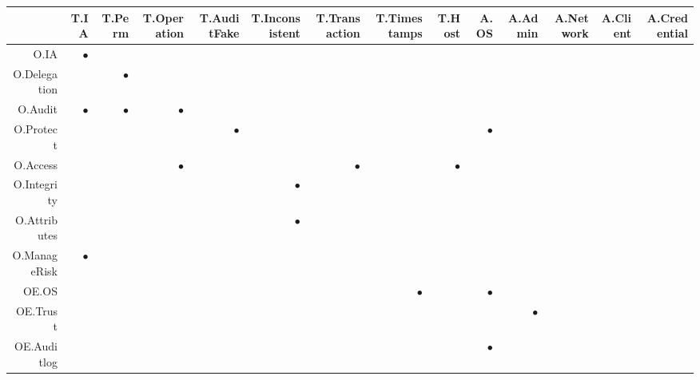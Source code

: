\documentclass[12pt,english]{scrbook}
\newcommand{\oh}{$\bullet$}
\begin{document}
  \begin{longtable}{r|R|R|R|R|R|R|R|R|R|R|R|R|R|}
    \toprule
              & T.IA  & T.Perm &T.Operation&T.AuditFake& T.Inconsistent&T.Transaction&T.Timestamps & T.Host & A.OS & A.Admin & A.Network & A.Client & A.Credential  \\
    \midrule\endhead
O.IA         &  \oh  &       &            &            &               &             &             &        &      &         &           &          &               \\
O.Delegation &       &   \oh &            &            &               &             &             &        &      &         &           &          &               \\
O.Audit      & \oh   &   \oh &     \oh    &            &               &             &             &        &      &         &           &          &               \\
O.Protect    &       &       &            &    \oh     &               &             &             &        & \oh  &         &           &          &               \\
O.Access     &       &       &      \oh   &            &               &    \oh      &             &   \oh  &      &         &           &          &               \\
O.Integrity  &       &       &            &            &  \oh          &             &             &        &      &         &           &          &               \\
O.Attributes &       &       &            &            &  \oh          &             &             &        &      &         &           &          &               \\
O.ManageRisk &   \oh &       &            &            &               &             &             &        &      &         &           &          &               \\
\midrule
OE.OS        &       &       &            &            &               &             &    \oh      &        &  \oh &         &         &            &          \\
OE.Trust     &       &       &            &            &               &             &             &        &      &  \oh    &         &            &            \\
OE.Auditlog  &       &       &            &            &               &             &             &        & \oh  &         &         &            &                   \\  

\end{longtable}
\end{document}
